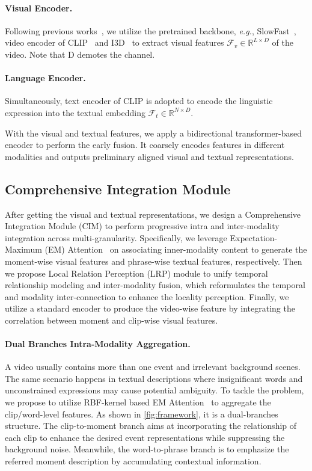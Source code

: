 \paragraph{Visual Encoder.} Following previous works~\cite{momentdetr,umt,qddetr,univtg}, we utilize the pretrained backbone, \textit{e.g.}, SlowFast~\cite{slowfast}, video encoder of CLIP~\cite{clip} and I3D~\cite{i3d} to extract visual features $\mathcal{F}_v \in \mathbb{R}^{L \times D}$ of the video. Note that D demotes the channel.
\vspace{-12pt}
\paragraph{Language Encoder.} Simultaneously, text encoder of CLIP is adopted to encode the linguistic expression into the textual embedding $\mathcal{F}_{t} \in \mathbb{R}^{N \times D}$.
 
With the visual and textual features, we apply a bidirectional transformer-based encoder to perform the early fusion.
It coarsely encodes features in different modalities and outputs preliminary aligned visual and textual representations.  

\subsection{Comprehensive Integration Module}
\label{sec:cim}
After getting the visual and textual representations, we design a Comprehensive Integration Module (CIM) to perform progressive intra and inter-modality integration across multi-granularity. 
Specifically, we leverage Expectation-Maximum (EM) Attention~\cite{em} on associating inner-modality content to generate the moment-wise visual features and phrase-wise textual features, respectively. 
Then we propose Local Relation Perception (LRP) module to unify temporal relationship modeling and inter-modality fusion, which reformulates the temporal and modality inter-connection to enhance the locality perception.
Finally, we utilize a standard encoder to produce the video-wise feature by integrating the correlation between moment and clip-wise visual features.
\vspace{-10pt}
\paragraph{Dual Branches Intra-Modality Aggregation.} A video usually contains more than one event and irrelevant background scenes.
The same scenario happens in textual descriptions where insignificant words and unconstrained expressions may cause potential ambiguity. 
To tackle the problem, we propose to utilize RBF-kernel based EM Attention~\cite{em,rskp} to aggregate the clip/word-level features. 
As shown in \cref{fig:framework}, it is a dual-branches structure.
The clip-to-moment branch aims at incorporating the relationship of each clip to enhance the desired event representations while suppressing the background noise.
Meanwhile, the word-to-phrase branch is to emphasize the referred moment description by accumulating contextual information.

